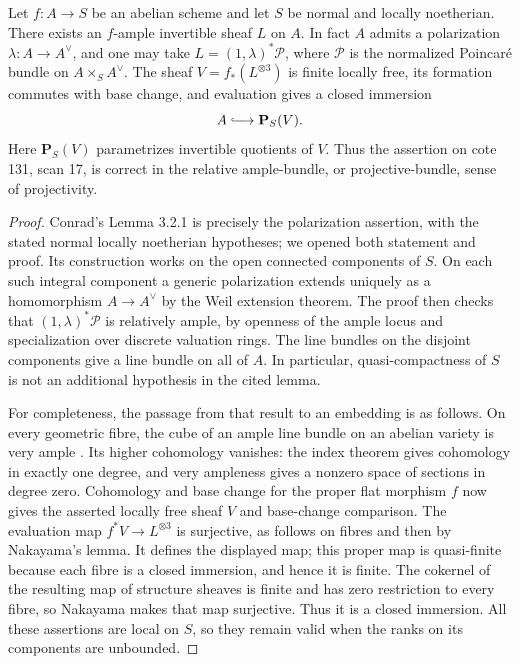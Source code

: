 \begin{theorem}
\label{A5:projectivity}
Let $f:A\to S$ be an abelian scheme and let $S$ be normal and locally
noetherian.  There exists an $f$-ample invertible sheaf $L$ on $A$.
In fact $A$ admits a polarization $\lambda:A\to A^\vee$, and one may take
$L=(1,\lambda)^*\mathcal P$, where $\mathcal P$ is the normalized Poincar\'e
bundle on $A\times_S A^\vee$.
The sheaf $V=f_*(L^{\otimes3})$ is finite locally free, its formation
commutes with base change, and evaluation gives a closed immersion
\[
             A\lhook\joinrel\longrightarrow\mathbf P_S(V).
\]
Here $\mathbf P_S(V)$ parametrizes invertible quotients of $V$.
Thus the assertion on cote 131, scan 17, is correct in the relative
ample-bundle, or projective-bundle, sense of projectivity.
\end{theorem}
\begin{proof}
Conrad's Lemma 3.2.1 \cite[p.~18]{ConradCanonical} is precisely the
polarization assertion, with the stated normal locally noetherian
hypotheses; we opened both statement and proof.  Its construction works
on the open connected components of $S$.  On each such integral component
a generic polarization extends uniquely as a homomorphism
$A\to A^\vee$ by the Weil extension theorem.  The proof then checks that
$(1,\lambda)^*\mathcal P$ is relatively ample, by openness of the ample
locus and specialization over discrete valuation rings.  The line bundles
on the disjoint components give a line bundle on all of $A$.  In particular,
quasi-compactness of $S$ is not an additional hypothesis in the cited lemma.

For completeness, the passage from that result to an embedding is as
follows.  On every geometric fibre, the cube of an ample line bundle on
an abelian variety is very ample \cite[Remark 7.3]{MilneAV}.
Its higher cohomology vanishes: the index theorem
\cite[Theorem 13.3(c)]{MilneAV} gives cohomology in exactly one degree,
and very ampleness gives a nonzero space of sections in degree zero.
Cohomology and base change for the proper flat morphism $f$ now gives
the asserted locally free sheaf $V$ and base-change comparison.
The evaluation map $f^*V\to L^{\otimes3}$ is surjective, as follows
on fibres and then by Nakayama's lemma.  It defines the displayed map;
this proper map is quasi-finite because each fibre is a closed immersion,
and hence it is finite.  The cokernel of the resulting map of structure
sheaves is finite and has zero restriction to every fibre, so Nakayama
makes that map surjective.  Thus it is a closed immersion.  All these
assertions are local on $S$, so they
remain valid when the ranks on its components are unbounded.
\end{proof}

